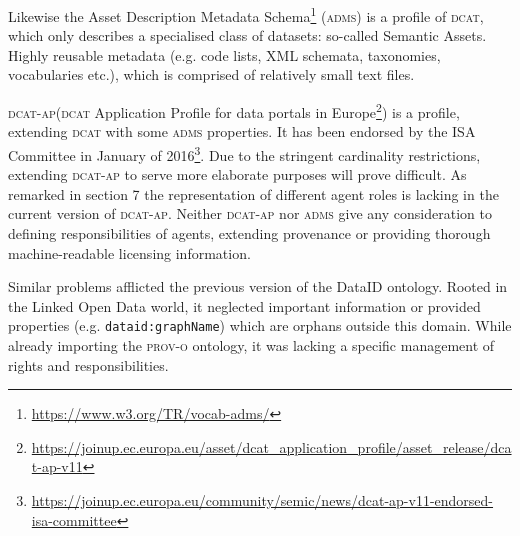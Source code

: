 \documentclass[runningheads,a4paper]{llncs}
\newcommand{\prov}{{\scshape prov-o}\xspace}
\newcommand{\dcat}{{\scshape dcat}\xspace}
\newcommand{\dcatap}{{\scshape dcat-ap}\xspace}
\newcommand{\adms}{{\scshape adms}\xspace}
\newcommand{\prop}[1]{{{\texttt{#1}}}}
\newcommand\footnoteurl[1]{\footnote{\scriptsize\url{#1}}}
\begin{document}
Likewise the Asset Description Metadata Schema\footnoteurl{https://www.w3.org/TR/vocab-adms/} (\adms) is a profile of \dcat, which only describes a specialised class of datasets: so-called Semantic Assets.
Highly reusable metadata (e.g. code lists, XML schemata, taxonomies, vocabularies etc.), which is comprised of relatively small text files.

\dcatap (\dcat Application Profile for data portals in Europe\footnoteurl{https://joinup.ec.europa.eu/asset/dcat_application_profile/asset_release/dcat-ap-v11}) is a profile, extending \dcat with some \adms properties. It has been endorsed by the ISA Committee in January of 2016\footnoteurl{https://joinup.ec.europa.eu/community/semic/news/dcat-ap-v11-endorsed-isa-committee}.  Due to the stringent cardinality restrictions, extending \dcatap to serve more elaborate purposes will prove difficult. As remarked in section 7 the representation of different agent roles is lacking in the current version of \dcatap.
Neither \dcatap nor \adms give any consideration to defining responsibilities of agents, extending provenance or providing thorough machine-readable licensing information.

Similar problems afflicted the previous version of the DataID ontology\cite{dataID2014}. Rooted in the Linked Open Data world, it neglected important information or provided properties (e.g. \prop{dataid:graphName}) which are orphans outside this domain. While already importing the \prov ontology, it was lacking a specific management of rights and responsibilities.
\end{document}
